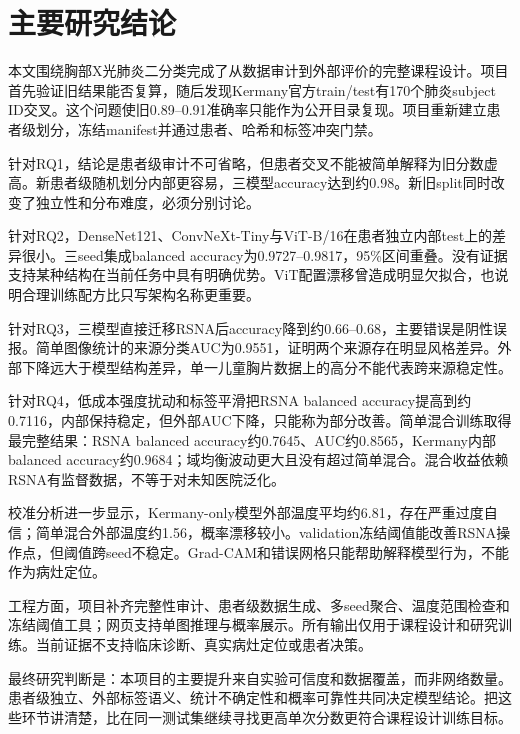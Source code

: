 \section{主要研究结论}

本文围绕胸部X光肺炎二分类完成了从数据审计到外部评价的完整课程设计。项目首先验证旧结果能否复算，随后发现Kermany官方train/test有170个肺炎subject ID交叉。这个问题使旧0.89--0.91准确率只能作为公开目录复现。项目重新建立患者级划分，冻结manifest并通过患者、哈希和标签冲突门禁。

针对RQ1，结论是患者级审计不可省略，但患者交叉不能被简单解释为旧分数虚高。新患者级随机划分内部更容易，三模型accuracy达到约0.98。新旧split同时改变了独立性和分布难度，必须分别讨论。

针对RQ2，DenseNet121、ConvNeXt-Tiny与ViT-B/16在患者独立内部test上的差异很小。三seed集成balanced accuracy为0.9727--0.9817，95\%区间重叠。没有证据支持某种结构在当前任务中具有明确优势。ViT配置漂移曾造成明显欠拟合，也说明合理训练配方比只写架构名称更重要。

针对RQ3，三模型直接迁移RSNA后accuracy降到约0.66--0.68，主要错误是阴性误报。简单图像统计的来源分类AUC为0.9551，证明两个来源存在明显风格差异。外部下降远大于模型结构差异，单一儿童胸片数据上的高分不能代表跨来源稳定性。

针对RQ4，低成本强度扰动和标签平滑把RSNA balanced accuracy提高到约0.7116，内部保持稳定，但外部AUC下降，只能称为部分改善。简单混合训练取得最完整结果：RSNA balanced accuracy约0.7645、AUC约0.8565，Kermany内部balanced accuracy约0.9684；域均衡波动更大且没有超过简单混合。混合收益依赖RSNA有监督数据，不等于对未知医院泛化。

校准分析进一步显示，Kermany-only模型外部温度平均约6.81，存在严重过度自信；简单混合外部温度约1.56，概率漂移较小。validation冻结阈值能改善RSNA操作点，但阈值跨seed不稳定。Grad-CAM和错误网格只能帮助解释模型行为，不能作为病灶定位。

工程方面，项目补齐完整性审计、患者级数据生成、多seed聚合、温度范围检查和冻结阈值工具；网页支持单图推理与概率展示。所有输出仅用于课程设计和研究训练。当前证据不支持临床诊断、真实病灶定位或患者决策。

最终研究判断是：本项目的主要提升来自实验可信度和数据覆盖，而非网络数量。患者级独立、外部标签语义、统计不确定性和概率可靠性共同决定模型结论。把这些环节讲清楚，比在同一测试集继续寻找更高单次分数更符合课程设计训练目标。
